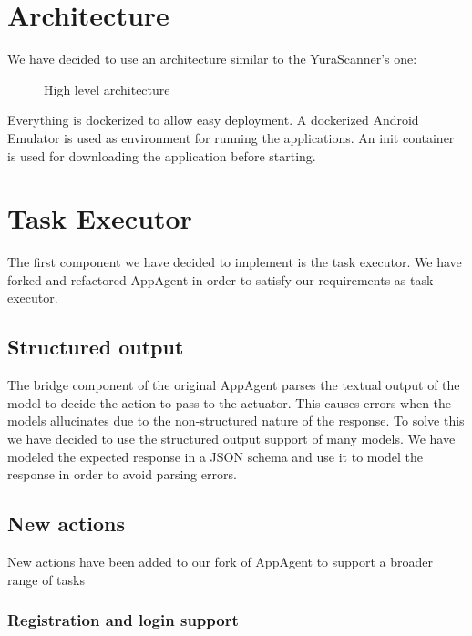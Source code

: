 \section{Architecture}\label{architecture}

We have decided to use an architecture similar to the YuraScanner's one:

\begin{figure}
\centering

\caption{High level architecture}
\end{figure}

Everything is dockerized to allow easy deployment. A dockerized Android
Emulator is used as environment for running the applications. An init
container is used for downloading the application before starting.

\section{Task Executor}\label{task-executor}

The first component we have decided to implement is the task executor.
We have forked and refactored AppAgent in order to satisfy our
requirements as task executor.

\subsection{Structured output}\label{structured-output}

The bridge component of the original AppAgent parses the textual output
of the model to decide the action to pass to the actuator. This causes
errors when the models allucinates due to the non-structured nature of
the response. To solve this we have decided to use the structured output
support of many models. We have modeled the expected response in a JSON
schema and use it to model the response in order to avoid parsing
errors.

\subsection{New actions}\label{new-actions}

New actions have been added to our fork of AppAgent to support a broader
range of tasks

\subsubsection{Registration and login
support}\label{registration-and-login-support}

